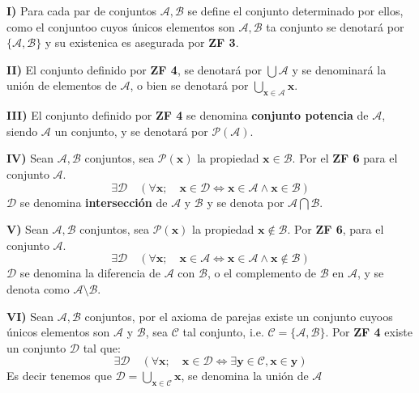 \begin{iteritem}
\item \textbf{I)} Para cada par de conjuntos $\mathcal{A},\mathcal{B}$ se define el conjunto determinado por ellos, 
como el conjuntoo cuyos únicos elementos son $\mathcal{A},\mathcal{B}$ ta conjunto se denotará por 
$\{\mathcal{A},\mathcal{B}\}$ y su existenica es asegurada por \textbf{ZF 3}.
\item \textbf{II)} El conjunto definido por \textbf{ZF 4}, se denotará por $\bigcup \mathcal{A}$ y se denominará
la unión de elementos de $\mathcal{A}$, o bien se denotará por $\bigcup_{\mathbf{x} \in \mathcal{A}} \mathbf{x}$.
\item \textbf{III)} El conjunto definido por \textbf{ZF 4} se denomina \textbf{conjunto potencia}
de $\mathcal{A}$, siendo $\mathcal{A}$ un conjunto, y se denotará por $\mathcal{P}(\mathcal{A})$.
\item \textbf{IV)} Sean $\mathcal{A},\mathcal{B}$ conjuntos, sea $\mathcal{P}(\mathbf{x})$ la propiedad $\mathbf{x} \in \mathcal{B}$.
Por el \textbf{ZF 6} para el conjunto $\mathcal{A}$.
\[ \exists \mathcal{D} \quad (\forall \mathbf{x}; \quad \mathbf{x} \in \mathcal{D} \Longleftrightarrow \mathbf{x} \in \mathcal{A} \wedge \mathbf{x} \in \mathcal{B})\]
$\mathcal{D}$ se denomina \textbf{intersección} de $\mathcal{A}$ y $\mathcal{B}$ y se denota por $\mathcal{A} \bigcap \mathcal{B}$.
\item \textbf{V)} Sean $\mathcal{A}, \mathcal{B}$ conjuntos, sea $\mathcal{P}(\mathbf{x})$ la propiedad $\mathbf{x} \notin \mathcal{B}$.
Por \textbf{ZF 6}, para el conjunto $\mathcal{A}$.
\[
\exists \mathcal{D} \quad (\forall \mathbf{x}; \quad \mathbf{x} \in \mathcal{A} \Longleftrightarrow \mathbf{x} \in \mathcal{A} \wedge \mathbf{x} \notin \mathcal{B})
\]
$\mathcal{D}$ se denomina la diferencia de $\mathcal{A}$ con $\mathcal{B}$, o el complemento de $\mathcal{B}$ en $\mathcal{A}$,
y se denota como $\mathcal{A} \setminus \mathcal{B}$.
\item \textbf{VI)} Sean $\mathcal{A}, \mathcal{B}$ conjuntos, por el axioma de parejas existe un conjunto cuyoos únicos elementos son
$\mathcal{A}$ y $\mathcal{B}$, sea $\mathcal{C}$ tal conjunto, i.e. $\mathcal{C} = \{ \mathcal{A}, \mathcal{B}\}$. Por \textbf{ZF 4}
existe un conjunto $\mathcal{D}$ tal que:
\[
\exists \mathcal{D} \quad (\forall \mathbf{x}; \quad \mathbf{x} \in \mathcal{D} \Longleftrightarrow \exists \mathbf{y} \in \mathcal{C}, \mathbf{x} \in \mathbf{y})
\]
Es decir tenemos que $\mathcal{D} = \bigcup_{\textbf{x} \in \mathcal{C}} \mathbf{x}$,  se denomina la unión de $\mathcal{A}$

\end{iteritem}

